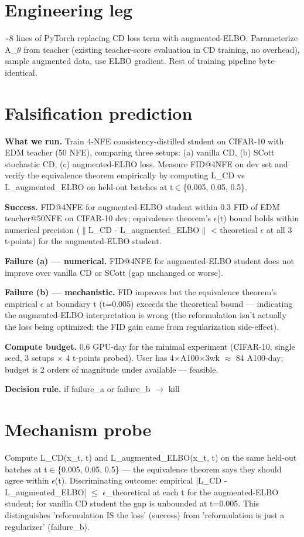 \documentclass[10pt,a4paper]{article}
\begin{document}
\begin{tcolorbox}[colback=bgskill, colframe=cblue, title=\textbf{NoveltySkill — Idea Card (L3 Oral-Ready)}, breakable]
\section*{Engineering leg}
\textasciitilde{}8 lines of PyTorch replacing CD loss term with augmented-ELBO. Parameterize A\_$\theta$ from teacher (existing teacher-score evaluation in CD training, no overhead), sample augmented data, use ELBO gradient. Rest of training pipeline byte-identical.

\section*{Falsification prediction}
\textbf{What we run.} Train 4-NFE consistency-distilled student on CIFAR-10 with EDM teacher (50 NFE), comparing three setups: (a) vanilla CD, (b) SCott stochastic CD, (c) augmented-ELBO loss. Measure FID@4NFE on dev set and verify the equivalence theorem empirically by computing L\_CD vs L\_augmented\_ELBO on held-out batches at t$\in$\{0.005, 0.05, 0.5\}.

\textbf{Success.} FID@4NFE for augmented-ELBO student within 0.3 FID of EDM teacher@50NFE on CIFAR-10 dev; equivalence theorem's $\epsilon$(t) bound holds within numerical precision ($\|$L\_CD - L\_augmented\_ELBO$\|$ < theoretical $\epsilon$ at all 3 t-points) for the augmented-ELBO student.

\textbf{Failure (a) — numerical.} FID@4NFE for augmented-ELBO student does not improve over vanilla CD or SCott (gap unchanged or worse).

\textbf{Failure (b) — mechanistic.} FID improves but the equivalence theorem's empirical $\epsilon$ at boundary t (t=0.005) exceeds the theoretical bound --- indicating the augmented-ELBO interpretation is wrong (the reformulation isn't actually the loss being optimized; the FID gain came from regularization side-effect).

\textbf{Compute budget.} 0.6 GPU-day for the minimal experiment (CIFAR-10, single seed, 3 setups $\times$ 4 t-points probed). User has 4$\times$A100$\times$3wk $\approx$ 84 A100-day; budget is 2 orders of magnitude under available --- feasible.

\textbf{Decision rule.} if failure\_a or failure\_b $\to$ kill

\section*{Mechanism probe}
Compute L\_CD(x\_t, t) and L\_augmented\_ELBO(x\_t, t) on the same held-out batches at t$\in$\{0.005, 0.05, 0.5\} --- the equivalence theorem says they should agree within $\epsilon$(t). Discriminating outcome: empirical |L\_CD - L\_augmented\_ELBO| $\le$ $\epsilon$\_theoretical at each t for the augmented-ELBO student; for vanilla CD student the gap is unbounded at t=0.005. This distinguishes 'reformulation IS the loss' (success) from 'reformulation is just a regularizer' (failure\_b).


\end{tcolorbox}
\end{document}
